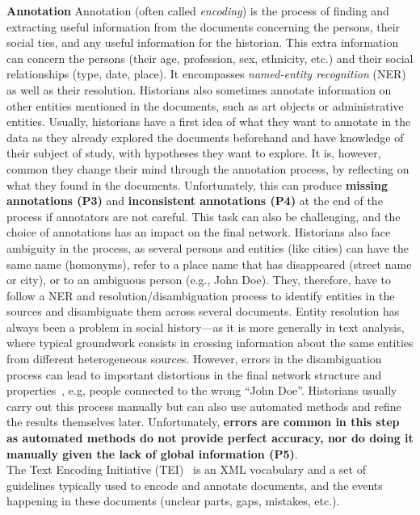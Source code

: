 \noindent\textbf{Annotation}
Annotation (often called \emph{encoding}) is the process of finding and extracting useful information from the documents concerning the persons, their social ties, and any useful information for the historian.
This extra information can concern the persons (their age, profession, sex, ethnicity, etc.) and their social relationships (type, date, place).
It encompasses \emph{named-entity recognition} (NER) as well as their resolution.
Historians also sometimes annotate information on other entities mentioned in the documents, such as art objects or administrative entities.
Usually, historians have a first idea of what they want to annotate in the data as they already explored the documents beforehand and have knowledge of their subject of study, with hypotheses they want to explore.
It is, however, common they change their mind through the annotation process, by reflecting on what they found in the documents.
Unfortunately, this can produce \textbf{missing annotations (P3)} and \textbf{inconsistent annotations (P4)} at the end of the process if annotators are not careful.
This task can also be challenging, and the choice of annotations has an impact on the final network.
Historians also face ambiguity in the process, as several persons and entities (like cities) can have the same name (homonyms), refer to a place name that has disappeared (street name or city), or to an ambiguous person (e.g., John Doe).
They, therefore, have to follow a NER and resolution/disambiguation process to identify entities in the sources and disambiguate them across several documents.
Entity resolution has always been a problem in social history---as it is more generally in text analysis, where typical groundwork consists in crossing information about the same entities from different heterogeneous sources.
However, errors in the disambiguation process can lead to important distortions in the final network structure and properties~\cite{diesnerImpactEntityDisambiguation2015}, e.g, people connected to the wrong ``John Doe''.
Historians usually carry out this process manually but can also use automated methods and refine the results themselves later.
Unfortunately, \textbf{errors are common in this step as automated methods do not provide perfect accuracy, nor do doing it manually given the lack of global information (P5)}.\\
The Text Encoding Initiative (TEI)~\cite{TEI} is an XML vocabulary and a set of guidelines typically used to encode and annotate documents, and the events happening in these documents (unclear parts, gaps, mistakes, etc.).
